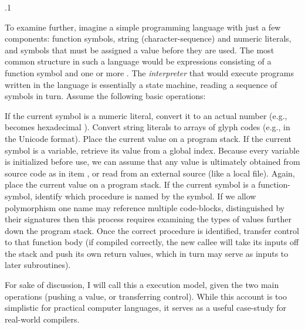 \documentclass[11pt, twocolumn]{article}
\begin{document}
\p.1{%
\:\+To examine further, imagine a simple programming language with
just a few components: function symbols, string (character-sequence)
and numeric literals, and 
symbols that must be assigned a value before they are used. \> 
The most common structure in such a language would be expressions consisting of a function
symbol and one or more . \>  The \textit{interpreter}
that would execute programs written in the language is essentially
a state machine, reading a sequence of symbols
in turn. \>  Assume the following basic operations:   \> \upAdj{6pt}



\begin{docEnumerate}

\enumsItem{}   If the current symbol is a numeric literal, convert it to an actual number
(e.g.,  becomes hexadecimal \OxFO{}). \>  Convert
string literals to arrays of glyph
codes (e.g., in the Unicode \UTFonesix{} format). \>  Place the current
value on a program stack.
\enumsItem{}  \>  If the current symbol is a variable, retrieve
its value from a global index. \>  Because every
variable is initialized before use, we can assume that
any value is ultimately obtained from source code
as in item , or read from an external source (like a local file). \> 
Again, place the current value on a program stack.
\enumsItem{}  \>  If the current symbol is a function-symbol, identify
which procedure is named by the symbol. \>  If we allow
polymorphism \mdash{} one name may reference multiple code-blocks,
distinguished by their signatures \mdash{} then this process
requires examining the types of values further down the
program stack. \>  Once the correct procedure is identified,
transfer control to that function body (if compiled
correctly, the new callee will take its inputs off the
stack and push its own return values, which in turn
may serve as inputs to later subroutines).\upAdj{9pt} \> 

\end{docEnumerate}

\nip{}%
For sake of discussion, I will call this a  execution
model, given the two main operations (pushing a value, or transferring
control). \>  While this account is too simplistic for practical computer
languages, it serves
as a useful case-study for real-world compilers.\<\;
}%
\end{document}
